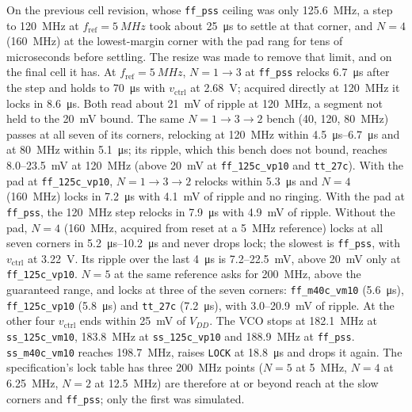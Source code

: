 \documentclass[10pt,twocolumn,letterpaper]{article}
\newcommand{\code}[1]{\texttt{\small #1}}
\begin{document}
On the previous cell revision, whose \code{ff\_pss} ceiling was only
\SI{125.6}{MHz}, a step to \SI{120}{MHz} at $f_\text{ref}=\SI{5}{MHz}$
took about \SI{25}{\micro s} to settle at that corner, and $N=4$
(\SI{160}{MHz}) at the lowest-margin corner with the pad rang for tens of
microseconds before settling. The resize was made to remove that limit,
and on the final cell it has. At $f_\text{ref}=\SI{5}{MHz}$, $N=1\to3$ at
\code{ff\_pss} relocks \SI{6.7}{\micro s} after the step and holds to
\SI{70}{\micro s} with $v_\text{ctrl}$ at \SI{2.68}{V}; acquired directly at
\SI{120}{MHz} it locks in \SI{8.6}{\micro s}. Both read about
\SI{21}{mV} of ripple at \SI{120}{MHz}, a segment not held to the
\SI{20}{mV} bound. The same $N=1\to3\to2$ bench (40, 120, \SI{80}{MHz}) passes at all seven of
its corners, relocking at \SI{120}{MHz} within \SIrange{4.5}{6.7}{\micro s}
and at \SI{80}{MHz} within \SI{5.1}{\micro s}; its ripple, which this bench
does not bound, reaches 8.0--\SI{23.5}{mV} at \SI{120}{MHz} (above
\SI{20}{mV} at \code{ff\_125c\_vp10} and \code{tt\_27c}). With the pad at \code{ff\_125c\_vp10},
$N=1\to3\to2$ relocks within \SI{5.3}{\micro s} and $N=4$ (\SI{160}{MHz})
locks in \SI{7.2}{\micro s} with \SI{4.1}{mV} of ripple and no ringing.
With the pad at \code{ff\_pss}, the \SI{120}{MHz} step relocks in
\SI{7.9}{\micro s} with \SI{4.9}{mV} of ripple. Without the pad, $N=4$ (\SI{160}{MHz}, acquired from reset at a
\SI{5}{MHz} reference) locks at all seven corners in
\SIrange{5.2}{10.2}{\micro s} and never drops lock; the slowest is
\code{ff\_pss}, with $v_\text{ctrl}$ at \SI{3.22}{V}. Its ripple over the
last \SI{4}{\micro s} is 7.2--\SI{22.5}{mV}, above \SI{20}{mV} only at
\code{ff\_125c\_vp10}. $N=5$ at the same reference asks for \SI{200}{MHz}, above the guaranteed
range, and locks at three of the seven corners: \code{ff\_m40c\_vm10}
(\SI{5.6}{\micro s}), \code{ff\_125c\_vp10} (\SI{5.8}{\micro s}) and
\code{tt\_27c} (\SI{7.2}{\micro s}), with 3.0--\SI{20.9}{mV} of ripple. At
the other four $v_\text{ctrl}$ ends within \SI{25}{mV} of $V_{DD}$. The VCO
stops at \SI{182.1}{MHz} at \code{ss\_125c\_vm10}, \SI{183.8}{MHz} at
\code{ss\_125c\_vp10} and \SI{188.9}{MHz} at \code{ff\_pss}.
\code{ss\_m40c\_vm10} reaches \SI{198.7}{MHz}, raises \code{LOCK} at
\SI{18.8}{\micro s} and drops it again. The specification's lock table has three
\SI{200}{MHz} points ($N=5$ at \SI{5}{MHz}, $N=4$ at \SI{6.25}{MHz}, $N=2$ at
\SI{12.5}{MHz}) are therefore at or beyond reach at the slow corners and
\code{ff\_pss}; only the first was simulated.
\end{document}
